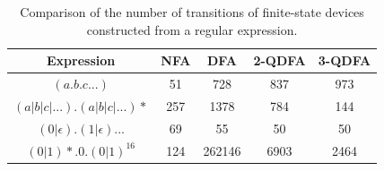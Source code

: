 \begin{table}[h]
  \centering
  \begin{tabular}{||c c c c c||} 
    \hline
    Expression & NFA & DFA & 2-QDFA & 3-QDFA \\ [0.5ex] 
    \hline
    $(a.b.c...)$ & 51 & 728 & 837 & 973 \\
    \hline
    $(a|b|c|...).(a|b|c|...)*$ & 257 & 1378 & 784 & 144 \\
    \hline
    $(0|\epsilon).(1|\epsilon)...$ & 69 & 55 & 50 & 50 \\
    \hline
    $(0|1)*.0.(0|1)^{16}$ & 124 & 262146 & 6903 & 2464 \\
    \hline
  \end{tabular}
  \caption{Comparison of the number of transitions of finite-state devices
    constructed from a regular expression.}
  \label{tbl:transition_comparison}
\end{table}
